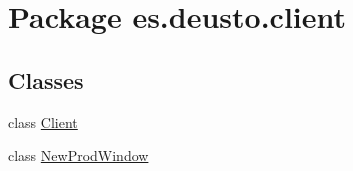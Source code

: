 \hypertarget{namespacees_1_1deusto_1_1client}{}\section{Package es.\+deusto.\+client}
\label{namespacees_1_1deusto_1_1client}
\subsection*{Classes}
\begin{DoxyCompactItemize}
\item 
class \hyperlink{classes_1_1deusto_1_1client_1_1_client}{Client}
\item 
class \hyperlink{classes_1_1deusto_1_1client_1_1_new_prod_window}{New\+Prod\+Window}
\end{DoxyCompactItemize}
